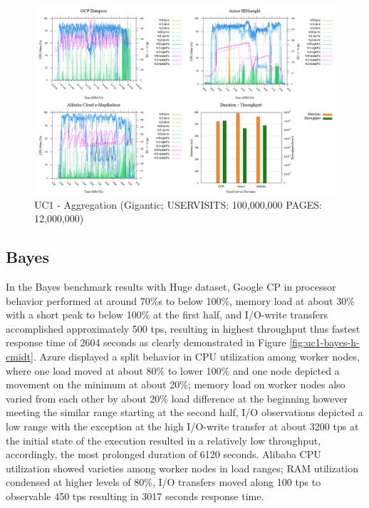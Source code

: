 \documentclass[review]{elsarticle}
\begin{document}
\begin{figure}[p]
	\caption{UC1 - Aggregation (Gigantic; USERVISITS: 100,000,000 PAGES: 12,000,000)}
	\label{fig:uc1-aggreg-g-cmidt}
	\includegraphics[width=\textwidth]{uc1-aggreg-g-cmidt}
	\centering
\end{figure}

\subsection{Bayes}
In the Bayes benchmark results with Huge dataset, Google CP in processor behavior performed at around 70\%s to below 100\%, memory load at about 30\% with a short peak to below 100\% at the first half, and I/O-write transfers accomplished approximately 500 tps, resulting in highest throughput thus fastest response time of 2604 seconds as clearly demonstrated in Figure \ref{fig:uc1-bayes-h-cmidt}. Azure displayed a split behavior in CPU utilization among worker nodes, where one load moved at about 80\% to lower 100\% and one node depicted a movement on the minimum at about 20\%; memory load on worker nodes also varied from each other by about 20\% load difference at the beginning however meeting the similar range starting at the second half, I/O observations depicted a low range with the exception at the high I/O-write transfer at about 3200 tps at the initial state of the execution resulted in a relatively low throughput, accordingly, the most prolonged duration of 6120 seconds. Alibaba CPU utilization showed varieties among worker nodes in load ranges; RAM utilization condensed at higher levels of 80\%, I/O transfers moved along 100 tps to observable 450 tps resulting in 3017 seconds response time.
\end{document}
